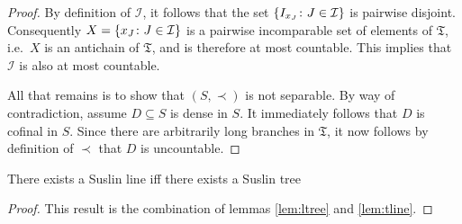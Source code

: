 \begin{proof}
	By definition of $\mathcal{I}$, it follows that the set
	$\left\lbrace I_{x_J}\colon J\in\mathcal{I} \right\rbrace$ is pairwise disjoint. Consequently
	$X=\left\lbrace x_J\colon J\in\mathcal{I} \right\rbrace$ is a pairwise incomparable set of elements
	of $\mathfrak{T}$, i.e.\ $X$ is an antichain of $\mathfrak{T}$, and is therefore
	at most countable.  This implies that $\mathcal{I}$ is also at most countable.

	All that remains is to show that $(S,\prec)$ is not separable.  By way of
	contradiction, assume $D\subseteq S$ is dense in $S$.  It immediately
	follows that $D$ is cofinal in $S$.  Since there are arbitrarily long
	branches in $\mathfrak{T}$, it now follows by definition of $\prec$ that $D$
	is uncountable.
\end{proof}

\begin{thm}
	There exists a Suslin line iff there exists a Suslin tree
\end{thm}
\begin{proof}
	This result is the combination of lemmas \ref{lem:ltree} and \ref{lem:tline}.
\end{proof}
